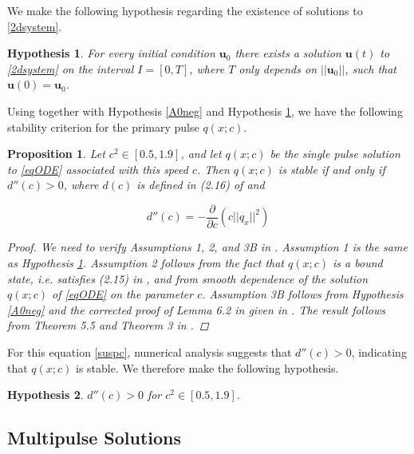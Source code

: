 \documentclass[12pt]{article}
\newtheorem{proposition}{Proposition}
\newtheorem{hypothesis}{Hypothesis}
\begin{document}
We make the following hypothesis regarding the existence of solutions to \eqref{2dsystem}.

\begin{hypothesis}\label{existhyp}
For every initial condition $\textbf{u}_0$ there exists a solution $\textbf{u}(t)$ to \eqref{2dsystem} on the interval $I = [0, T]$, where $T$ only depends on $||\textbf{u}_0||$, such that $\textbf{u}(0) = \textbf{u}_0$. 
\end{hypothesis}

Using \cite{Grillakis1987} together with Hypothesis \ref{A0neg} and Hypothesis \ref{existhyp}, we have the following stability criterion for the primary pulse $q(x; c)$. 

\begin{proposition}\label{stabcrit}
Let $c^2 \in [0.5, 1.9]$, and let $q(x; c)$ be the single pulse solution to \eqref{eqODE} associated with this speed $c$. Then $q(x; c)$ is stable if and only if $d''(c) > 0$, where $d(c)$ is defined in (2.16) of \cite{Grillakis1987} and 

\begin{equation}\label{dcc}
d''(c) = -\frac{\partial}{\partial c} \left( c ||q_x||^2 \right)
\end{equation}

\begin{proof}
We need to verify Assumptions 1, 2, and 3B in \cite{Grillakis1987}. Assumption 1 is the same as Hypothesis \ref{existhyp}. Assumption 2 follows from the fact that $q(x; c)$ is a bound state, i.e. satisfies (2.15) in \cite{Grillakis1987}, and from smooth dependence of the solution $q(x; c)$ of \eqref{eqODE} on the parameter $c$. Assumption 3B follows from Hypothesis \ref{A0neg} and the corrected proof of Lemma 6.2 in \cite{Grillakis1987} given in \cite{Grillakis1990}. The result follows from Theorem 5.5 and Theorem 3 in \cite{Grillakis1987}.

\end{proof}
\end{proposition}

For this equation \eqref{suspc}, numerical analysis suggests that $d''(c) > 0$, indicating that $q(x; c)$ is stable. We therefore make the following hypothesis.

\begin{hypothesis}\label{hypdccpos}
$d''(c) > 0$ for $c^2 \in [0.5, 1.9]$.
\end{hypothesis}

\subsection{Multipulse Solutions}
\end{document}

